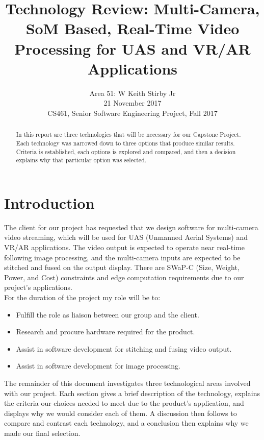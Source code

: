 \documentclass[letterpaper,10pt,serif,draftclsnofoot,onecolumn,compsoc,titlepage]{IEEEtran}
\title{Technology Review: Multi-Camera, SoM Based, Real-Time Video Processing for UAS and VR/AR Applications}
\author{Area 51: W Keith Stirby Jr \\ 21 November 2017 \\ CS461, Senior Software Engineering Project, Fall 2017}
\begin{document}
\begin{titlepage}
\maketitle
\begin{abstract}

In this report are three technologies that will be necessary for our Capstone Project. 
Each technology was narrowed down to three options that produce similar 
results. Criteria is established, each options is explored and compared, and then 
a decision  explains why that particular option was selected. \\

\thispagestyle{empty}
\end{abstract}
\end{titlepage}
\newpage
\tableofcontents
\newpage

\section{Introduction}

The client for our project has requested that we design software for multi-camera video 
streaming, which will be used for UAS (Unmanned Aerial Systems) and VR/AR applications. 
The video output is expected to operate near real-time following image processing, and the multi-camera inputs are 
expected to be stitched and fused on the output display. There are SWaP-C (Size, Weight, Power,
and Cost) constraints and edge computation requirements due to our project's applications. \\

For the duration of the project my role will be to:
\begin{itemize}
	\itemsep-2em
	\item Fulfill the role as liaison between our group and the client. \\
	\item Research and procure hardware required for the product. \\
	\item Assist in software development for stitching and fusing video output. \\
	\item Assist in software development for image processing. \\
\end{itemize}

The remainder of this document investigates three technological areas involved with 
our project. Each section gives a brief description of the technology, explains the 
criteria our choices needed to meet due to the product's application, and displays why 
we would consider each of them. A discussion then follows to compare and contrast each 
technology, and a conclusion then explains why we made our final selection.\\
\end{document}
